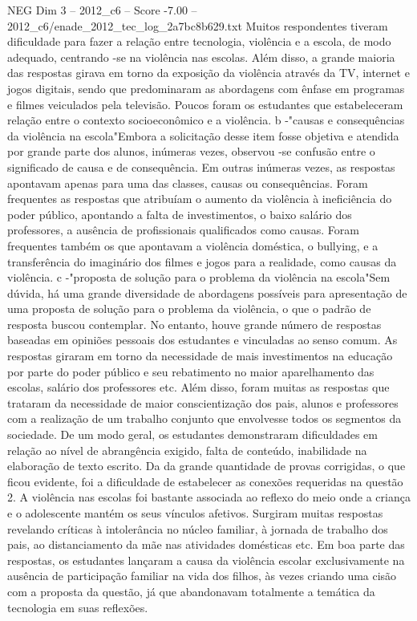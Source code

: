 \begin{textsample}{NEG Dim 3 – 2012\_c6 – Score -7.00 – 2012\_c6/enade\_2012\_tec\_log\_2a7bc8b629.txt}
Muitos respondentes tiveram dificuldade para fazer a relação entre tecnologia, violência e a escola, de modo adequado, centrando -se na violência nas escolas.
Além disso, a grande maioria das respostas girava em torno da exposição da violência através da TV, internet e jogos digitais, sendo que predominaram as abordagens com ênfase em programas e filmes veiculados pela televisão.
Poucos foram os estudantes que estabeleceram relação entre o contexto socioeconômico e a violência. b -"causas e consequências da violência na escola"Embora a solicitação desse item fosse objetiva e atendida por grande parte dos alunos, inúmeras vezes, observou -se confusão entre o significado de causa e de consequência.
Em outras inúmeras vezes, as respostas apontavam apenas para uma das classes, causas ou consequências.
Foram frequentes as respostas que atribuíam o aumento da violência à ineficiência do poder público, apontando a falta de investimentos, o baixo salário dos professores, a ausência de profissionais qualificados como causas.
Foram frequentes também os que apontavam a violência doméstica, o bullying, e a transferência do imaginário dos filmes e jogos para a realidade, como causas da violência. c -"proposta de solução para o problema da violência na escola"Sem dúvida, há uma grande diversidade de abordagens possíveis para apresentação de uma proposta de solução para o problema da violência, o que o padrão de resposta buscou contemplar.
No entanto, houve grande número de respostas baseadas em opiniões pessoais dos estudantes e vinculadas ao senso comum.
As respostas giraram em torno da necessidade de mais investimentos na educação por parte do poder público e seu rebatimento no maior aparelhamento das escolas, salário dos professores etc.
Além disso, foram muitas as respostas que trataram da necessidade de maior conscientização dos pais, alunos e professores com a realização de um trabalho conjunto que envolvesse todos os segmentos da sociedade.
De um modo geral, os estudantes demonstraram dificuldades em relação ao nível de abrangência exigido, falta de conteúdo, inabilidade na elaboração de texto escrito.
Da da grande quantidade de provas corrigidas, o que ficou evidente, foi a dificuldade de estabelecer as conexões requeridas na questão 2.
A violência nas escolas foi bastante associada ao reflexo do meio onde a criança e o adolescente mantém os seus vínculos afetivos.
Surgiram muitas respostas revelando críticas à intolerância no núcleo familiar, à jornada de trabalho dos pais, ao distanciamento da mãe nas atividades domésticas etc.
Em boa parte das respostas, os estudantes lançaram a causa da violência escolar exclusivamente na ausência de participação familiar na vida dos filhos, às vezes criando uma cisão com a proposta da questão, já que abandonavam totalmente a temática da tecnologia em suas reflexões.

\end{textsample}

